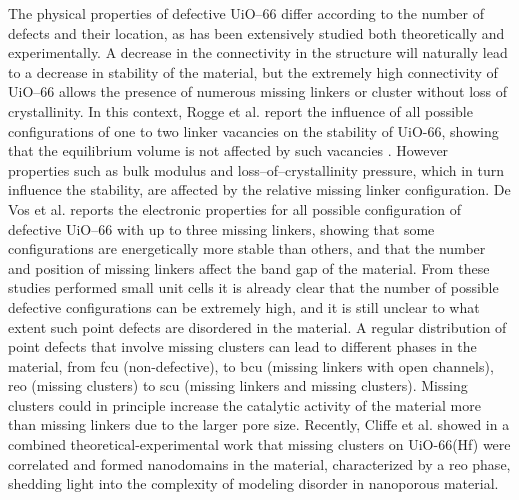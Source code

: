 \npar
The physical properties of defective UiO--66 differ according to the number of defects and their location, as has been extensively studied both theoretically and experimentally. A decrease in the connectivity in the structure will naturally lead to a decrease in stability of the material, but the extremely high connectivity of UiO--66 allows the presence of numerous missing linkers or cluster without loss of crystallinity. In this context, Rogge et al. report the influence of all possible configurations of one to two linker vacancies on the stability of UiO-66, showing that the equilibrium volume is not affected by such vacancies \cite{rogge2016thermodynamic}. However properties such as bulk modulus and loss--of--crystallinity pressure, which in turn influence the stability, are affected by the relative missing linker configuration. De Vos et al.\cite{devos2017missing} reports the electronic properties for all possible configuration of defective UiO--66 with up to three missing linkers, showing that some configurations are energetically more stable than others, and that the number and position of missing linkers affect the band gap of the material. From these studies performed small unit cells it is already clear that the number of possible defective configurations can be extremely high, and it is still unclear to what extent such point defects are disordered in the material. A regular distribution of point defects that involve missing clusters can lead to different phases in the material, from fcu (non-defective), to bcu (missing linkers with open channels), reo (missing clusters) to scu (missing linkers and missing clusters). Missing clusters could in principle increase the catalytic activity of the material more than missing linkers due to the larger pore size. Recently, Cliffe et al. \cite{cliffe2014correlated} showed in a combined theoretical-experimental work that missing clusters on UiO-66(Hf) were correlated and formed nanodomains in the material, characterized by a reo phase, shedding light into the complexity of modeling disorder in nanoporous material. 

